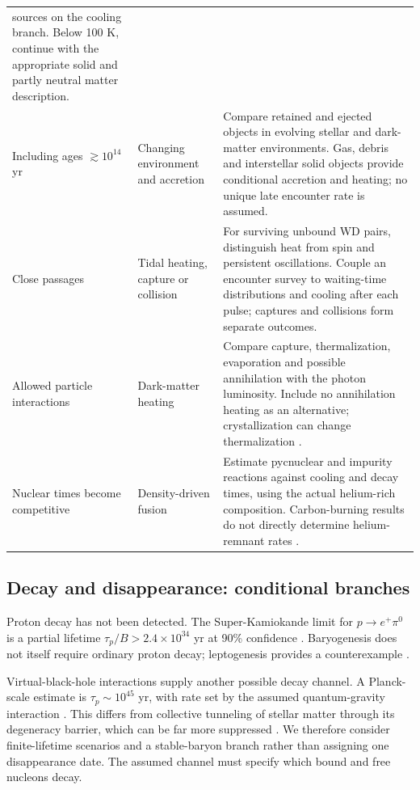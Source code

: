 {\begin{tabular}{@{}>{\raggedright\arraybackslash}p{}
 >{\raggedright\arraybackslash}p{}
 >{\raggedright\arraybackslash}p{}@{}}
sources on the cooling branch. Below 100 K, continue with the appropriate
solid and partly neutral matter description. \\[4pt]
Including ages $\gtrsim10^{14}$ yr & Changing environment and accretion &
Compare retained and ejected objects in evolving stellar and dark-matter
environments. Gas, debris and interstellar solid objects provide conditional
accretion and heating; no unique late encounter rate is assumed. \\[4pt]
Close passages & Tidal heating, capture or collision &
For surviving unbound WD pairs, distinguish heat from spin and persistent
oscillations. Couple an encounter survey to waiting-time distributions and
cooling after each pulse; captures and collisions form separate outcomes. \\[4pt]
Allowed particle interactions & Dark-matter heating &
Compare capture, thermalization, evaporation and possible annihilation with
the photon luminosity. Include no annihilation heating as an alternative;
crystallization can change thermalization \cite{bell24}. \\[4pt]
Nuclear times become competitive & Density-driven fusion &
Estimate pycnuclear and impurity reactions against cooling and decay times,
using the actual helium-rich composition. Carbon-burning results do not
directly determine helium-remnant rates \cite{gasques05}. \\
\bottomrule
\end{tabular}}

\clearpage
\subsection{Decay and disappearance: conditional branches}
Proton decay has not been detected. The Super-Kamiokande limit for
$p\rightarrow e^+\pi^0$ is a partial lifetime
$\tau_p/B>2.4\times10^{34}$ yr at 90\% confidence \cite{takenaka20}.
Baryogenesis does not itself require ordinary proton decay; leptogenesis
provides a counterexample \cite{fukugita86}.

Virtual-black-hole interactions supply another possible decay channel. A
Planck-scale estimate is $\tau_p\sim10^{45}$ yr, with rate set by the assumed
quantum-gravity interaction \cite{adams01}. This differs from collective
tunneling of stellar matter through its degeneracy barrier, which can be far
more suppressed \cite{adams98}. We therefore consider finite-lifetime
scenarios and a stable-baryon branch rather than assigning one disappearance
date. The assumed channel must specify which bound and free nucleons decay.

